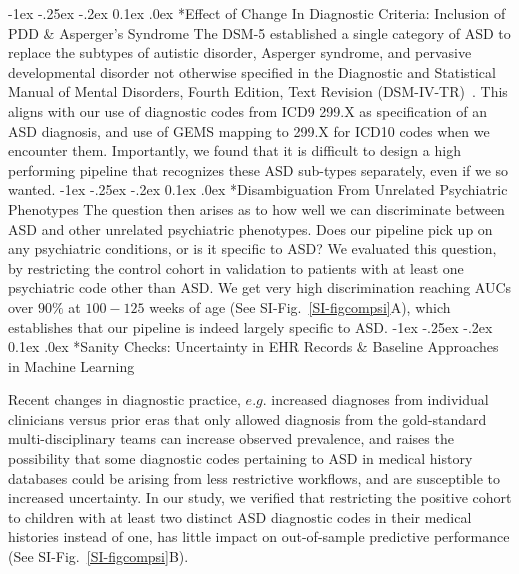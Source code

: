 \documentclass[onecolumn,,10pt]{IEEEtran}
\makeatletter
\renewcommand\subsection{\@startsection {section}{1}{\z@}%
  {-1ex \@plus -.25ex \@minus -.2ex}%
  {0.1ex \@plus.0ex}%
  {\fontsize{11}{12}\selectfont\bfseries\sffamily\color{DodgerBlue4}}}
\newcommand{\hil}[1]{{\color{Red1}\itshape #1}}
\def\treatment{positive\xspace}
\makeatother
\begin{document}
\subsection*{Effect of Change In Diagnostic Criteria: Inclusion of PDD \&  Asperger's Syndrome}
%
The DSM-5 established
a single category of ASD to replace
the subtypes of autistic disorder,
Asperger syndrome, and pervasive
developmental disorder not
otherwise specified in the Diagnostic
and Statistical Manual of Mental
Disorders, Fourth Edition, Text
Revision (DSM-IV-TR)~\cite{hyman2020identification}. This aligns with our use of diagnostic codes from ICD9 299.X as specification of an ASD diagnosis, and use of GEMS mapping to 299.X for ICD10 codes when we encounter them.
%
Importantly, we found that it is  difficult to design a high performing pipeline that recognizes these ASD sub-types separately, even if we so wanted.
%
\subsection*{Disambiguation From Unrelated Psychiatric Phenotypes}
%
 The  question then arises as to how well we can discriminate between ASD and other unrelated psychiatric phenotypes. Does our pipeline pick up on any psychiatric conditions, or is it specific to ASD? We  evaluated this question, by restricting the  control  cohort in validation to  patients with at least one psychiatric code other than ASD. We get very high discrimination reaching AUCs over $90\%$ at $100-125$ weeks of age (See SI-Fig.~\ref{SI-figcompsi}A), which establishes that our pipeline is indeed largely specific to ASD.
%
\subsection*{Sanity Checks: Uncertainty in EHR Records \& Baseline Approaches in Machine Learning}

Recent changes in diagnostic practice, $e.g.$ increased diagnoses from individual clinicians versus prior eras that only allowed diagnosis from the gold-standard multi-disciplinary teams can  increase observed   prevalence, and  raises the possibility that  some diagnostic codes pertaining to ASD in medical history databases could be arising from less restrictive workflows, and  are susceptible to increased uncertainty.  In our study, we verified that restricting the \treatment cohort to children with at least two  distinct ASD diagnostic codes in their medical histories instead of one, has little impact on  out-of-sample predictive performance (See SI-Fig.~\ref{SI-figcompsi}B).
 
\end{document}
